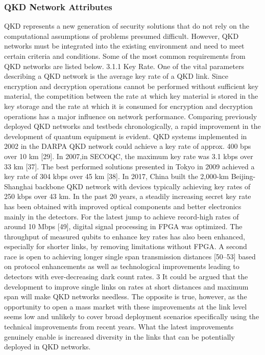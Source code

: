 \subsubsection*{QKD Network Attributes}
QKD represents a new generation of security solutions that do not rely on the computational assumptions of problems presumed difficult. However, QKD networks must be integrated into the existing environment and need to meet certain criteria and conditions. Some of the most common requirements from QKD networks are listed below.
3.1.1 Key Rate. One of the vital parameters describing a QKD network is the average key rate of a QKD link. Since encryption and decryption operations cannot be performed without sufficient key material, the competition between the rate at which key material is stored in the key storage and the rate at which it is consumed for encryption and decryption operations has a major influence on network performance.
Comparing previously deployed QKD networks and testbeds chronologically, a rapid improvement in the development of quantum equipment is evident. QKD systems implemented in 2002 in the DARPA QKD network could achieve a key rate of approx. 400 bps over 10 km [29]. In 2007,in SECOQC, the maximum key rate was 3.1 kbps over 33 km [37]. The best performed solutions presented in Tokyo in 2009 achieved a key rate of 304 kbps over 45 km [38]. In 2017, China built the 2,000-km Beijing-Shanghai backbone QKD network with devices typically achieving key rates of 250 kbps over 43 km.
In the past 20 years, a steadily increasing secret key rate has been obtained with improved optical components and better electronics mainly in the detectors. For the latest jump to achieve record-high rates of around 10 Mbps [49], digital signal processing in FPGA was optimized. The throughput of measured qubits to enhance key rates has also been enhanced, especially for shorter links, by removing limitations without FPGA. A second race is open to achieving longer single span transmission distances [50–53] based on protocol enhancements as well as technological improvements leading to detectors with ever-decreasing dark count rates. 3 It could be argued that the development to improve single links on rates at short distances and maximum span will make QKD networks needless. The opposite is true, however, as the opportunity to open a mass market with these improvements at the link level seems low and unlikely to cover broad deployment scenarios specifically using the technical improvements from recent years. What the latest improvements genuinely enable is increased diversity in the links that can be potentially deployed in QKD networks.
